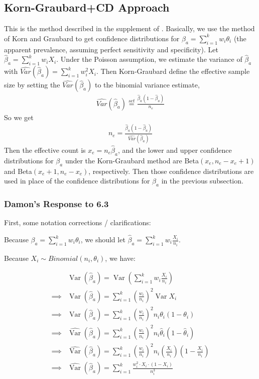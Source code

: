 \documentclass{article}
\DeclareMathOperator{\Var}{Var}
\begin{document}
\subsection{Korn-Graubard+CD Approach} 

This is the method described in the supplement of \citet{Kali:2021}.
Basically, we use the method of Korn and Graubard to get confidence distributions for ${\beta}_a = \sum_{i=1}^{k} w_i \theta_i$ (the apparent prevalence, assuming perfect sensitivity and specificity).
Let $\hat{\beta}_a= \sum_{i=1}^{k} w_i X_i$. Under the Poisson assumption, we estimate the variance 
of $\hat{\beta}_a$ with $\widehat{Var}(\hat{\beta}_a) = \sum_{i=1}^{k} w_i^2 X_i$. Then Korn-Graubard define the effective sample size by setting the $\widehat{Var}(\hat{\beta}_a)$ to the binomial variance estimate,
\begin{eqnarray*}
\widehat{Var}(\hat{\beta}_a) \stackrel{set}{=} \frac{\hat{\beta}_a (1-\hat{\beta}_a)}{n_e}
\end{eqnarray*}
So we get 
\begin{eqnarray*}
n_e =   \frac{\hat{\beta}_a (1-\hat{\beta}_a)}{\widehat{Var}(\hat{\beta}_a)}
\end{eqnarray*}
Then the effective count is $x_e = n_e \hat{\beta}_a$, and the lower and upper confidence distributions for ${\beta}_a$ under the Korn-Graubard method are Beta$(x_e, n_e-x_e+1)$ and Beta$(x_e+1,n_e-x_e)$, respectively. 
Then those confidence distributions are used in place of the confidence distributions for $\beta_a$ in the previous subsection. 

\subsubsection{Damon's Response to 6.3}

First, some notation corrections / clarifications:

Because ${\beta}_a = \sum_{i=1}^{k} w_i \theta_i$, we should let $\hat{\beta}_a= \sum_{i=1}^{k} w_i \frac{X_i}{n_i}$.

Because \( X_i \sim Binomial(n_i, \theta_i )\), we have:

\begin{align*}
	        &   \Var \left( \hat{\beta}_a \right)   =  \Var \left( \sum_{i=1}^k w_i \frac{X_i}{n_i}\right)\\
	\implies&   \Var \left( \hat{\beta}_a \right)   =  \sum_{i=1}^k \left( \frac{w_i}{n_i} \right)^2 \Var X_i \\
	\implies&   \Var \left( \hat{\beta}_a \right)   =  \sum_{i=1}^k \left( \frac{w_i}{n_i} \right)^2 n_i \theta_i (1 - \theta_i) \\
	\implies&   \widehat{\Var} \left( \hat{\beta}_a \right)   =  \sum_{i=1}^k \left( \frac{w_i}{n_i} \right)^2 n_i \hat{\theta}_i (1 - \hat{\theta}_i) \\
	\implies&   \widehat{\Var} \left( \hat{\beta}_a \right)   =  \sum_{i=1}^k \left( \frac{w_i}{n_i} \right)^2 n_i \left( \frac{X_i}{n_i} \right) \left(1 - \frac{X_i}{n_i}\right) \\
\implies&   \widehat{\Var} \left( \hat{\beta}_a \right)   =  \sum_{i=1}^k \frac{w_i^2 \cdot X_i \cdot(1 - X_i) }{n_i^3}
\end{align*}
\end{document}
